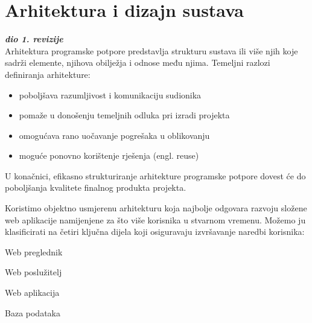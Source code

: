\chapter{Arhitektura i dizajn sustava}
		
		\textbf{\textit{dio 1. revizije}}\\

		Arhitektura programske potpore predstavlja strukturu sustava ili više njih koje sadrži elemente, njihova obilježja i odnose među njima. Temeljni razlozi definiranja arhitekture:		

	\begin{itemize}
		\item 	{poboljšava razumljivost i komunikaciju sudionika}
		\item 	{pomaže u donošenju temeljnih odluka pri izradi projekta}
		\item 	{omogućava rano uočavanje pogrešaka u oblikovanju}		
		\item         {moguće ponovno korištenje rješenja (engl. reuse)}
	\end{itemize}

	U konačnici, efikasno strukturiranje arhitekture programske potpore dovest će do poboljšanja kvalitete finalnog produkta projekta.

	\vspace{10mm} %

	Koristimo objektno usmjerenu arhitekturu koja najbolje odgovara razvoju složene web aplikacije namijenjene za što više korisnika u stvarnom vremenu. Možemo ju klasificirati na četiri ključna dijela koji osiguravaju izvršavanje naredbi korisnika: 
		
	\begin{packed_enum}
		\item 	{Web preglednik}
		\item 	{Web poslužitelj}
		\item 	{Web aplikacija}
		\item 	{Baza podataka}
	\end{packed_enum}			


